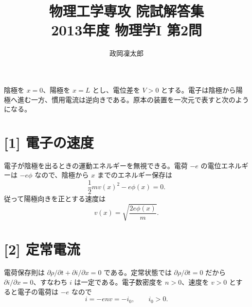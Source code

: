 \documentclass[11pt,a4paper]{article}
\title{物理工学専攻 院試解答集\\2013年度 物理学I 第2問}
\author{政岡凜太郎}
\date{}
\begin{document}
\maketitle

陰極を $x=0$、陽極を $x=L$ とし、電位差を $V>0$ とする。電子は陰極から陽極へ進む一方、慣用電流は逆向きである。原本の装置を一次元で表すと次のようになる。
\begin{center}
\end{center}

\section*{[1] 電子の速度}
電子が陰極を出るときの運動エネルギーを無視できる。電荷 $-e$ の電位エネルギーは $-e\phi$ なので、陰極から $x$ までのエネルギー保存は
\begin{equation}
  \frac12 m v(x)^2-e\phi(x)=0.
\end{equation}
従って陽極向きを正とする速度は
\begin{equation}
  \boxed{v(x)=\sqrt{\frac{2e\phi(x)}{m}}}.
\end{equation}

\section*{[2] 定常電流}
電荷保存則は $\partial\rho/\partial t+\partial i/\partial x=0$ である。定常状態では $\partial\rho/\partial t=0$ だから $\partial i/\partial x=0$、すなわち $i$ は一定である。電子数密度を $n>0$、速度を $v>0$ とすると電子の電荷は $-e$ なので
\begin{equation}
  i=-env=-i_0,\qquad i_0>0.
\end{equation}
\end{document}
